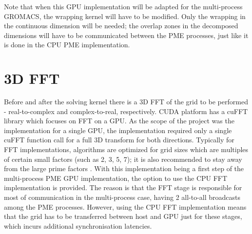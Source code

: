 \documentclass[12pt,a4paper,notitlepage]{report}
\begin{document}
Note that when this GPU implementation will be adapted for the multi-process GROMACS, the wrapping kernel will have to be modified. Only the wrapping in the continuous dimension will be needed; the overlap zones in the decomposed dimensions will have to be communicated between the PME processes, just like it is done in the CPU PME implementation. 

\section{3D FFT} \label{FFTimpl}

Before and after the solving kernel there is a 3D FFT of the grid to be performed - real-to-complex and complex-to-real, respectively. 
CUDA platform has a cuFFT library which focuses on FFT on a GPU. 
As the scope of the project was the implementation for a single GPU, the implementation required only a single cuFFT function call for a full 3D transform for both directions. 
Typically for FFT implementations, algorithms are optimized for grid sizes which are multiples of certain small factors (such as 2, 3, 5, 7); it is also recommended to stay away from the large prime factors \cite{cufft}.
With this implementation being a first step of the multi-process PME GPU implementation, the option to use the CPU FFT implementation is provided. The reason is that the FFT stage is responsible for most of communication in the multi-process case, having 2 all-to-all broadcasts among the PME processes. However, using the CPU FFT implementation means that the grid has to be transferred between host and GPU just for these stages, which incurs additional synchronisation latencies.

\end{document}
